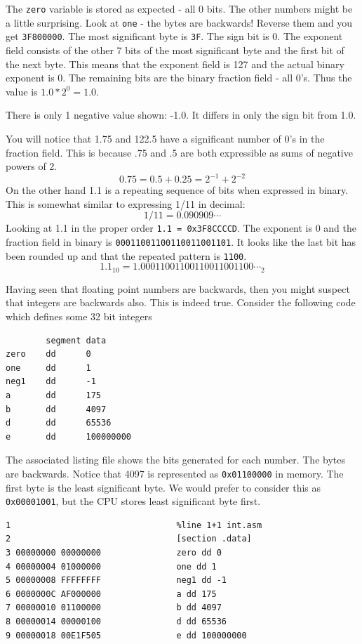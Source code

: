 \documentclass[11pt,b5paper]{book}
\begin{document}
The {\tt zero} variable is stored as expected - all 0 bits.
The other numbers might be a little surprising.
Look at {\tt one} - the bytes are backwards!
Reverse them and you get {\tt 3F800000}.
The most significant byte is {\tt 3F}.  The sign bit is 0.
The exponent field consists of the other 7 bits of the most significant byte
and the first bit of the next byte.
This means that the exponent field is 127 and the actual binary exponent is 0.
The remaining bits are the binary fraction field - all 0's.
Thus the value is $1.0 * 2^0 = 1.0$.

There is only 1 negative value shown: -1.0.
It differs in only the sign bit from 1.0.

You will notice that 1.75 and 122.5 have a significant number of 0's in the
fraction field.
This is because .75 and .5 are both expressible as sums of negative powers of
2.
$$0.75 = 0.5 + 0.25 = 2^{-1} + 2^{-2}$$
On the other hand 1.1 is a repeating sequence of bits when expressed in
binary.
This is somewhat similar to expressing 1/11 in decimal:
$$1/11 = 0.090909\cdots$$
Looking at 1.1 in the proper order {\tt 1.1 = 0x3F8CCCCD}.
The exponent is 0 and the fraction field in binary is
{\tt 00011001100110011001101}.
It looks like the last bit has been rounded up and that the repeated pattern
is {\tt 1100}.
$$1.1_{10} = 1.00011001100110011001100\cdots_2$$

Having seen that floating point numbers are backwards, then you might suspect
that integers are backwards also.
This is indeed true.
Consider the following code which defines some 32 bit integers
\begin{verbatim}
        segment data
zero    dd      0
one     dd      1
neg1    dd      -1
a       dd      175
b       dd      4097
d       dd      65536
e       dd      100000000
\end{verbatim}

The associated listing file shows the bits generated for each number.
The bytes are backwards.  Notice that 4097 is represented as {\tt 0x01100000}
in memory.
The first byte is the least significant byte.
We would prefer to consider this as {\tt 0x00001001}, but the CPU stores least
significant byte first.

\begin{verbatim}
1                                 %line 1+1 int.asm
2                                 [section .data]
3 00000000 00000000               zero dd 0
4 00000004 01000000               one dd 1
5 00000008 FFFFFFFF               neg1 dd -1
6 0000000C AF000000               a dd 175
7 00000010 01100000               b dd 4097
8 00000014 00000100               d dd 65536
9 00000018 00E1F505               e dd 100000000
\end{verbatim}
\end{document}
